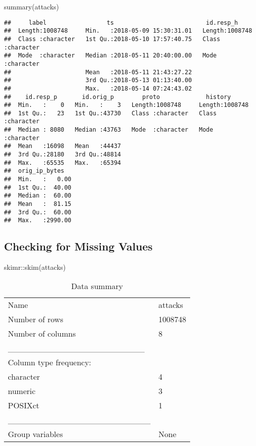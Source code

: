 \documentclass[
]{article}
\newenvironment{Shaded}{\begin{snugshade}}{\end{snugshade}}
\newcommand{\FunctionTok}[1]{\textcolor[rgb]{0.00,0.00,0.00}{#1}}
\newcommand{\NormalTok}[1]{#1}
\newcommand{\SpecialCharTok}[1]{\textcolor[rgb]{0.00,0.00,0.00}{#1}}
\begin{document}
\begin{Shaded}
\begin{Highlighting}[]
\FunctionTok{summary}\NormalTok{(attacks)}
\end{Highlighting}
\end{Shaded}

\begin{verbatim}
##     label                 ts                          id.resp_h        
##  Length:1008748     Min.   :2018-05-09 15:30:31.01   Length:1008748    
##  Class :character   1st Qu.:2018-05-10 17:57:40.75   Class :character  
##  Mode  :character   Median :2018-05-11 20:40:00.00   Mode  :character  
##                     Mean   :2018-05-11 21:43:27.22                     
##                     3rd Qu.:2018-05-13 01:13:40.00                     
##                     Max.   :2018-05-14 07:24:43.02                     
##    id.resp_p       id.orig_p        proto             history         
##  Min.   :    0   Min.   :    3   Length:1008748     Length:1008748    
##  1st Qu.:   23   1st Qu.:43730   Class :character   Class :character  
##  Median : 8080   Median :43763   Mode  :character   Mode  :character  
##  Mean   :16098   Mean   :44437                                        
##  3rd Qu.:28180   3rd Qu.:48814                                        
##  Max.   :65535   Max.   :65394                                        
##  orig_ip_bytes    
##  Min.   :   0.00  
##  1st Qu.:  40.00  
##  Median :  60.00  
##  Mean   :  81.15  
##  3rd Qu.:  60.00  
##  Max.   :2990.00
\end{verbatim}

\hypertarget{checking-for-missing-values}{%
\subsection{Checking for Missing
Values}\label{checking-for-missing-values}}

\begin{Shaded}
\begin{Highlighting}[]
\NormalTok{skimr}\SpecialCharTok{::}\FunctionTok{skim}\NormalTok{(attacks)}
\end{Highlighting}
\end{Shaded}

\begin{longtable}[]{@{}ll@{}}
\caption{Data summary}\tabularnewline
\toprule()
\endhead
Name & attacks \\
Number of rows & 1008748 \\
Number of columns & 8 \\
\_\_\_\_\_\_\_\_\_\_\_\_\_\_\_\_\_\_\_\_\_\_\_ & \\
Column type frequency: & \\
character & 4 \\
numeric & 3 \\
POSIXct & 1 \\
\_\_\_\_\_\_\_\_\_\_\_\_\_\_\_\_\_\_\_\_\_\_\_\_ & \\
Group variables & None \\
\bottomrule()
\end{longtable}
\end{document}
